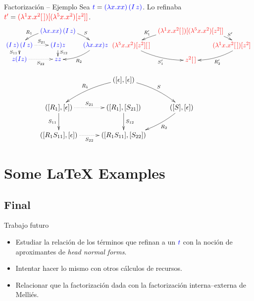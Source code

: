 \documentclass{beamer}
\newcommand{\cLam}[1]{{\color{darkBlue} #1}}
\newcommand{\cDist}[1]{{\color{red} #1}}
\begin{document}
\begin{frame}{Factorización -- Ejemplo}
Sea $\cLam{t} = \cLam{(\lam{\var}{\var\var})\,(I\, \varthree)}$.
Lo refinaba $\cDist{t'} = \cDist{(\lamp{1}{x}{x^2 [\,]}) [(\lamp{5}{x}{x^2}) [z^2]]}$.
{\scriptsize
\[
  \xymatrix@=.2cm{
  &
    \cLam{(\lam{\var}{\var\var})\,(I\, \varthree)}
    \ar@/_.25cm/[dl]_-{\redex_1}
    \ar@/^.25cm/[dr]^-{\redextwo}
  &
  &
  \\
    \cLam{(I\, \varthree)\, (I\, \varthree)}
    \ar[d]_-{\redextwo_{11}}
    \ar@{.>}[r]^-{\redextwo_{21}}
  &
    \cLam{(I\varthree)\varthree}
    \ar[d]^{\redextwo_{12}}
  &
    \cLam{(\lam{\var}{\var\var})\varthree}
    \ar@/^.25cm/[dl]^-{\redex_2}
  \\
    \cLam{\varthree (I\varthree)}
    \ar@{.>}[r]_-{\redextwo_{22}}
  &
    \cLam{ \varthree \varthree}
  }\hspace{-0.4cm}\xymatrix@=.2cm{
  &
    \cDist{(\lamp{1}{x}{x^2 [\,]}) [(\lamp{5}{x}{x^2}) [z^2]]}
    \ar@/_.25cm/[dl]_-{\redex'_1}
    \ar@/^.25cm/[dr]^-{\redextwo'}
  \\
    \cDist{(\lamp{5}{x}{x^2}) [z^2] [\,]}
    \ar@/_.25cm/[dr]_-{\redextwo'_1}
  &
  &
    \cDist{\hspace{-1cm}(\lamp{1}{x}{x^2 [\,]}) [z^2]}
    \ar@/^.25cm/[dl]^-{\redex'_2}
  \\
  &
    \cDist{z^2 [\,]}
  }
\]
}

\[
  \xymatrix@C=1cm{
  &
    ([\epsilon], [\epsilon])
    \ar@/_.25cm/[dl]_-{\redex_1}
    \ar@/^.25cm/[dr]^-{\redextwo}
  &
  &
  \\
    ([\redex_1], [\epsilon])
    \ar[d]_-{\redextwo_{11}}
    \ar@{.>}[r]^-{\redextwo_{21}}
  &
    ([\redex_1], [\redextwo_{21}])
    \ar[d]^{\redextwo_{12}}
  &
    ([\redextwo], [\epsilon])
    \ar@/^.25cm/[dl]^-{\redex_2}
  \\
    ([\redex_1 \redextwo_{11}], [\epsilon])
    \ar@{.>}[r]_-{\redextwo_{22}}
  &
    ([\redex_1 \redextwo_{11}], [\redextwo_{22}])
  }
\]
\end{frame}

\section{Some \LaTeX{} Examples}

\subsection{Final}
\begin{frame}{Trabajo futuro}
\begin{itemize}
  \item Estudiar la relación de los términos que refinan a un $\cLam{t}$ con la noción de
    aproximantes de \emph{head normal forms}.
  \item Intentar hacer lo mismo con otros cálculos de recursos.
  \item Relacionar que la factorización dada con la factorización interna--externa de Melliés.
\end{itemize}
\end{frame}
\end{document}
